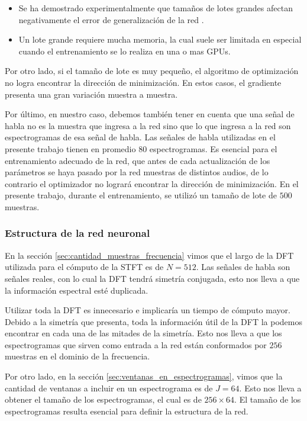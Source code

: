 \begin{itemize}
	\item Se ha demostrado experimentalmente que tamaños de lotes grandes afectan negativamente el error de generalización de la red \cite{on_large_batch_training}.
	\item Un lote grande requiere mucha memoria, la cual suele ser limitada en especial cuando el entrenamiento se lo realiza en una o mas GPUs.
\end{itemize}

Por otro lado, si el tamaño de lote es muy pequeño, el algoritmo de optimización no logra encontrar la dirección de minimización. En estos casos, el gradiente presenta una gran variación muestra a muestra.

Por último, en nuestro caso, debemos también tener en cuenta que una señal de habla no es la muestra que ingresa a la red sino que lo que ingresa a la red son espectrogramas de esa señal de habla. Las señales de habla utilizadas en el presente trabajo tienen en promedio 80 espectrogramas. Es esencial para el entrenamiento adecuado de la red, que antes de cada actualización de los parámetros se haya pasado por la red muestras de distintos audios, de lo contrario el optimizador no logrará encontrar la dirección de minimización. En el presente trabajo, durante el entrenamiento, se utilizó un tamaño de lote de $500$ muestras.

\subsubsection{Estructura de la red neuronal}

En la sección \ref{sec:cantidad_muestras_frecuencia} vimos que el largo de la DFT utilizada para el cómputo de la STFT es de $N=512$. Las señales de habla son señales reales, con lo cual la DFT tendrá simetría conjugada, esto nos lleva a que la información espectral esté duplicada.

Utilizar toda la DFT es innecesario e implicaría un tiempo de cómputo mayor. Debido a la simetría que presenta, toda la información útil de la DFT la podemos encontrar en cada una de las mitades de la simetría. Esto nos lleva a que los espectrogramas que sirven como entrada a la red están conformados por $256$ muestras en el dominio de la frecuencia.

Por otro lado, en la sección \ref{sec:ventanas_en_espectrogramas}, vimos que la cantidad de ventanas a incluir en un espectrograma es de $J=64$. Esto nos lleva a obtener el tamaño de los espectrogramas, el cual es de $256 \times 64$. El tamaño de los espectrogramas resulta esencial para definir la estructura de la red.

